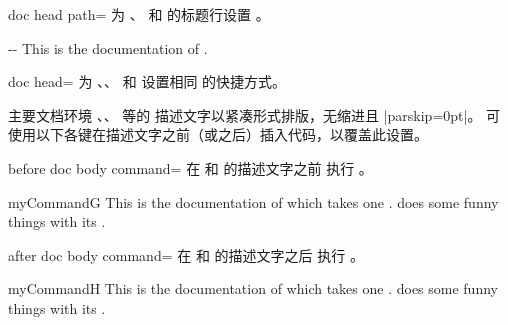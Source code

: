 \begin{docTcbKey}[][doc new=2019-09-18]{doc head path}{=}{\tcbdocdescInitEmpty}
  为 、 和 
  的标题行设置 。
\begin{dispExample}

\begin{docPathOperation*}{-{}-}{}
  This is the documentation of .
\end{docPathOperation*}
\end{dispExample}
\end{docTcbKey}


\begin{docTcbKey}[][doc updated=2019-09-18]{doc head}{=}{\tcbdocdescInitEmpty}
  为 、、
   和 
  设置相同  的快捷方式。
\end{docTcbKey}


\clearpage

主要文档环境 、、 等的
描述文字以紧凑形式排版，无缩进且 |parskip=0pt|。
可使用以下各键在描述文字之前（或之后）插入代码，以覆盖此设置。

\begin{docTcbKey}[][doc new=2015-10-09]{before doc body command}{=}{\tcbdocdescInitEmpty}
  在  和  的描述文字之前
  执行 。
\begin{dispExample}

\begin{docCommand*}{myCommandG}{}
  This is the documentation of  which takes one .
   does some funny things with its .
\end{docCommand*}
\end{dispExample}
\end{docTcbKey}


\begin{docTcbKey}[][doc new=2015-10-09]{after doc body command}{=}{\tcbdocdescInitEmpty}
  在  和  的描述文字之后
  执行 。
\begin{dispExample}

\begin{docCommand*}{myCommandH}{}
  This is the documentation of  which takes one .
   does some funny things with its .
\end{docCommand*}
\end{dispExample}
\end{docTcbKey}


